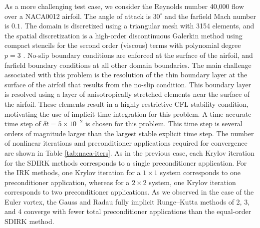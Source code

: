 \documentclass[review]{siamart}
\begin{document}
As a more challenging test case, we consider the Reynolds number 40{,}000 flow over a NACA0012 airfoil.
The angle of attack is $30^\circ$ and the farfield Mach number is $0.1$.
The domain is discretized using a triangular mesh with 3154 elements, and the spatial discretization is a high-order discontinuous Galerkin method using compact stencils for the second order (viscous) terms with polynomial degree $p=3$ \cite{Peraire2008}.
No-slip boundary conditions are enforced at the surface of the airfoil, and farfield boundary conditions at all other domain boundaries.
The main challenge associated with this problem is the resolution of the thin boundary layer at the surface of the airfoil that results from the no-slip condition.
This boundary layer is resolved using a layer of anisotropically stretched elements near the surface of the airfoil.
These elements result in a highly restrictive CFL stability condition, motivating the use of implicit time integration for this problem.
A time accurate time step of $\delta t = 5 \times 10^{-2}$ is chosen for this problem.
This time step is several orders of magnitude larger than the largest stable explicit time step.
The number of nonlinear iterations and preconditioner applications required for convergence are shown in Table \ref{tab:naca-iters}.
As in the previous case, each Krylov iteration for the SDIRK methods corresponds to a single preconditioner application.
For the IRK methods, one Krylov iteration for a $1\times1$ system corresponds to one preconditioner application, whereas for a $2\times2$ system, one Krylov iteration corresponds to two preconditioner applications.
As we observed in the case of the Euler vortex, the Gauss and Radau fully implicit Runge--Kutta methods of 2, 3, and 4 converge with fewer total preconditioner applications than the equal-order SDIRK method.
\end{document}
